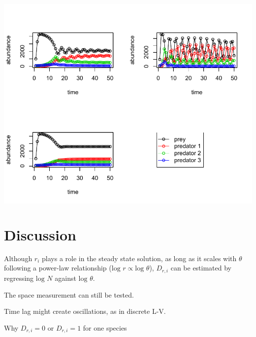 \documentclass[12pt]{article}
\begin{document}
\includegraphics[width=\textwidth]{integrated_multi_predators.pdf}

\section{Discussion}
Although $r_i$ plays a role in the steady state solution, as long as it scales with $\theta$ following a power-law relationship ($\mbox{log }r \propto \mbox{log }\theta$), $D_{r,i}$ can be estimated by regressing $\mbox{log }N$ against $\mbox{log }\theta$.

The space measurement can still be tested.

Time lag might create oscillations, as in discrete L-V.

Why $D_{r,i}=0$ or $D_{r,i}=1$ for one species 
\end{document}
